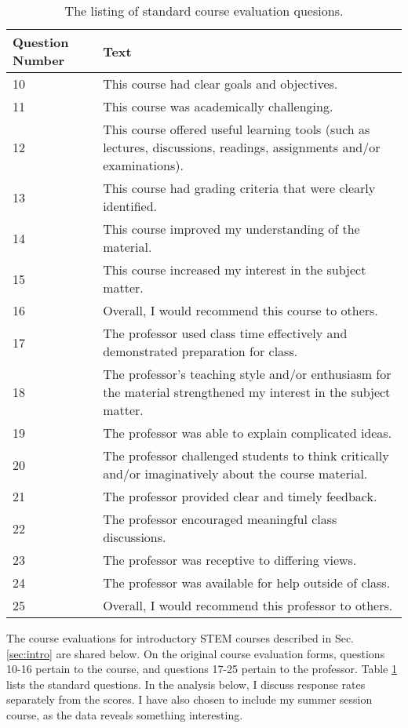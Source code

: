 \documentclass[../../main.tex]{subfiles}
\begin{document}
\begin{table}[ht]
\footnotesize
\centering
\begin{tabular}{| p{2cm} | p{12cm} |}
\hline
\hline
Question Number & Text \\ \hline
10 & This course had clear goals and objectives. \\ \hline
11 & This course was academically challenging. \\ \hline
12 & This course offered useful learning tools (such as lectures, discussions, readings, assignments and/or examinations). \\ \hline
13 & This course had grading criteria that were clearly identified. \\ \hline
14 & This course improved my understanding of the material. \\ \hline
15 & This course increased my interest in the subject matter. \\ \hline
16 & Overall, I would recommend this course to others. \\ \hline
17 & The professor used class time effectively and demonstrated preparation for class. \\ \hline
18 & The professor's teaching style and/or enthusiasm for the material strengthened my interest in the subject matter. \\ \hline
19 & The professor was able to explain complicated ideas. \\ \hline
20 & The professor challenged students to think critically and/or imaginatively about the course material. \\ \hline
21 & The professor provided clear and timely feedback. \\ \hline
22 & The professor encouraged meaningful class discussions. \\ \hline
23 & The professor was receptive to differing views. \\ \hline
24 & The professor was available for help outside of class. \\ \hline
25 & Overall, I would recommend this professor to others. \\ \hline
\hline
\end{tabular}
\caption{\label{tab:questions} The listing of standard course evaluation quesions.}
\end{table}

The course evaluations for introductory STEM courses described in Sec. \ref{sec:intro} are shared below.  On the original course evaluation forms, questions 10-16 pertain to the course, and questions 17-25 pertain to the professor.  Table \ref{tab:questions} lists the standard questions.  In the analysis below, I discuss response rates separately from the scores.  I have also chosen to include my summer session course, as the data reveals something interesting.
\end{document}

